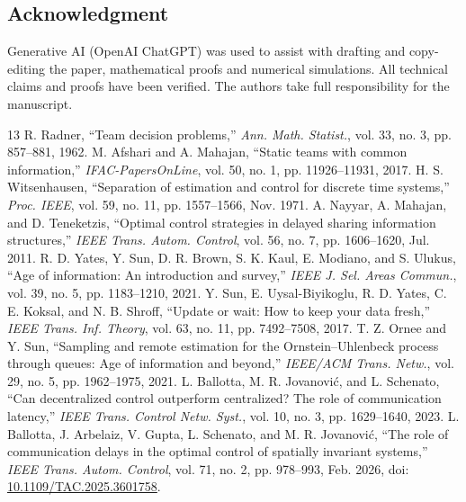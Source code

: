 \documentclass[letterpaper,10pt,conference]{ieeeconf}
\begin{document}
\begin{samepage}
\section*{Acknowledgment}
Generative AI (OpenAI ChatGPT) was used to assist with drafting and copy-editing the paper, mathematical proofs and numerical simulations. All technical claims and proofs have been verified. The authors take full responsibility for the manuscript.
\end{samepage}

\begin{thebibliography}{13}
 R. Radner, ``Team decision problems,'' \emph{Ann. Math. Statist.}, vol. 33, no. 3, pp. 857--881, 1962.
 M. Afshari and A. Mahajan, ``Static teams with common information,'' \emph{IFAC-PapersOnLine}, vol. 50, no. 1, pp. 11926--11931, 2017.
 H. S. Witsenhausen, ``Separation of estimation and control for discrete time systems,'' \emph{Proc. IEEE}, vol. 59, no. 11, pp. 1557--1566, Nov. 1971.
 A. Nayyar, A. Mahajan, and D. Teneketzis, ``Optimal control strategies in delayed sharing information structures,'' \emph{IEEE Trans. Autom. Control}, vol. 56, no. 7, pp. 1606--1620, Jul. 2011.
 R. D. Yates, Y. Sun, D. R. Brown, S. K. Kaul, E. Modiano, and S. Ulukus, ``Age of information: An introduction and survey,'' \emph{IEEE J. Sel. Areas Commun.}, vol. 39, no. 5, pp. 1183--1210, 2021.
 Y. Sun, E. Uysal-Biyikoglu, R. D. Yates, C. E. Koksal, and N. B. Shroff, ``Update or wait: How to keep your data fresh,'' \emph{IEEE Trans. Inf. Theory}, vol. 63, no. 11, pp. 7492--7508, 2017.
 T. Z. Ornee and Y. Sun, ``Sampling and remote estimation for the Ornstein--Uhlenbeck process through queues: Age of information and beyond,'' \emph{IEEE/ACM Trans. Netw.}, vol. 29, no. 5, pp. 1962--1975, 2021.
 L. Ballotta, M. R. Jovanovi{\'c}, and L. Schenato, ``Can decentralized control outperform centralized? The role of communication latency,'' \emph{IEEE Trans. Control Netw. Syst.}, vol. 10, no. 3, pp. 1629--1640, 2023.
 L. Ballotta, J. Arbelaiz, V. Gupta, L. Schenato, and M. R. Jovanovi{\'c}, ``The role of communication delays in the optimal control of spatially invariant systems,'' \emph{IEEE Trans. Autom. Control}, vol. 71, no. 2, pp. 978--993, Feb. 2026, doi: \href{https://doi.org/10.1109/TAC.2025.3601758}{10.1109/TAC.2025.3601758}.

\end{thebibliography}
\end{document}
